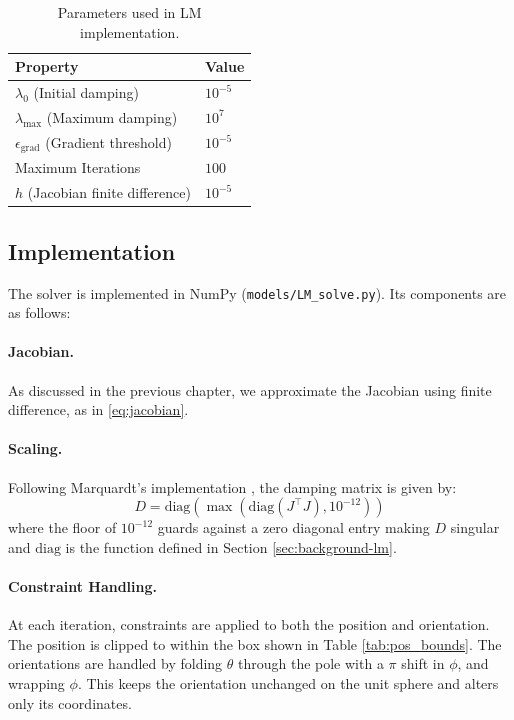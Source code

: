 \begin{table}
  \centering
  \begin{tabular}{ll}
    \toprule
    Property & Value \\
    \midrule
    $\lambda_0$ (Initial damping) & $10^{-5}$ \\
    $\lambda_{\max}$ (Maximum damping) & $10^{7}$ \\
    $\epsilon_{\mathrm{grad}}$ (Gradient threshold) & $10^{-5}$ \\
    Maximum Iterations & $100$ \\
    $h$ (Jacobian finite difference) & $10^{-5}$ \\
    \bottomrule
  \end{tabular}
  \caption{Parameters used in LM implementation.}
  \label{tab:lm_parameters}
\end{table}

\subsection{Implementation}
The solver is implemented in NumPy (\lstinline[style=python]|models/LM_solve.py|). Its components are as follows:

\paragraph{Jacobian.} As discussed in the previous chapter, we approximate the Jacobian using finite difference, as in \eqref{eq:jacobian}.

\paragraph{Scaling.} Following Marquardt's implementation \cite{marquardt1963}, the damping matrix is given by:
\begin{equation}
  D = \text{diag}(\max(\text{diag}(J^\top J), 10^{-12}))
\end{equation}
where the floor of $10^{-12}$ guards against a zero diagonal entry making $D$ singular and $\text{diag}$ is the function defined in Section \ref{sec:background-lm}.

\paragraph{Constraint Handling.} At each iteration, constraints are applied to both the position and orientation. The position is clipped to within the box shown in Table \ref{tab:pos_bounds}. The orientations are handled by folding $\theta$ through the pole with a $\pi$ shift in $\phi$, and wrapping $\phi$. This keeps the orientation unchanged on the unit sphere and alters only its coordinates.

